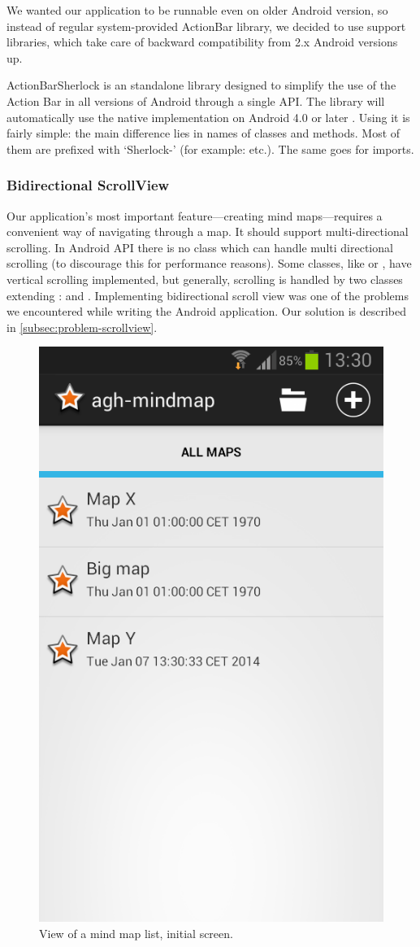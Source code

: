 We wanted our application to be runnable even on older Android version, so instead of regular system-provided ActionBar library, we decided to use support libraries, which take care of backward compatibility from 2.x Android versions up.

ActionBarSherlock is an standalone library designed to simplify the use of the Action Bar in all versions of Android through a single API. The library will automatically use the native  implementation on Android 4.0 or later \cite{Wharton:2013:sherlock}. Using it is fairly simple: the main difference lies in names of  classes and methods. Most of them are prefixed with `Sherlock-' (for example:  etc.). The same goes for imports.

\subsubsection{Bidirectional ScrollView}
\label{subsubsec:action-bar}
Our application's most important feature---creating mind maps---requires a convenient way of navigating through a map. It should support multi-directional scrolling. In Android API there is no class which can handle multi directional scrolling (to discourage this for performance reasons). Some classes, like  or , have vertical scrolling implemented, but generally, scrolling is handled by two classes extending :  and . Implementing bidirectional scroll view was one of the problems we encountered while writing the Android application. Our solution is described in \cref{subsec:problem-scrollview}.

\begin{figure}[h]
	\centering
	\includegraphics[width=.5\textwidth]{graphics-screenshot-list}
	\caption{View of a mind map list, initial screen.}
	\label{fig:screen-maplist}
\end{figure}

